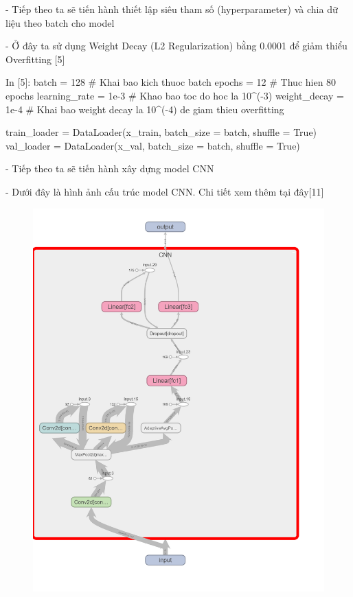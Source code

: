 \documentclass[12pt, a4paper]{article}
\begin{document}
\par - Tiếp theo ta  sẽ tiến hành thiết lập siêu tham số (hyperparameter) và chia dữ liệu theo batch cho model
\par - Ở đây ta sử dụng Weight Decay (L2 Regularization) bằng 0.0001 để giảm thiểu Overfitting [5]
\begin{python}
In [5]: batch = 128 # Khai bao kich thuoc batch
        epochs = 12 # Thuc hien 80 epochs
        learning_rate = 1e-3 # Khao bao toc do hoc la 10^(-3)
        weight_decay = 1e-4 # Khai bao weight decay la 10^(-4) de giam thieu overfitting
        
        train_loader = DataLoader(x_train, batch_size = batch, shuffle = True)
        val_loader = DataLoader(x_val, batch_size = batch, shuffle = True)
\end{python}
\par - Tiếp theo ta sẽ tiến hành xây dựng model CNN
\par - Dưới đây là hình ảnh cấu trúc model CNN. Chi tiết xem thêm tại đây[11]
\newpage
\begin{figure}[h] %
    \centering
    \includegraphics[scale = 0.2]{Img/Pre_Fut/P4.png}
\end{figure}
\end{document}
